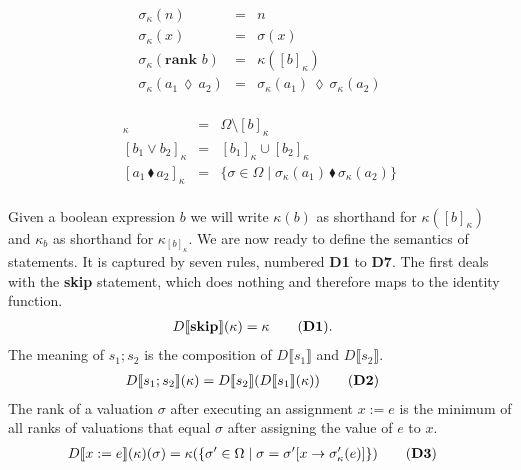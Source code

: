 \documentclass{llncs}
\newcommand{\mods}[2]{[#2]_{#1}}
\newcommand{\dn}[1]{D\llbracket #1 \rrbracket}
\newcommand{\areth}{\lozenge}
\newcommand{\comp}{\blacklozenge}
\newcommand{\States}{\Omega}
\begin{document}
\noindent\begin{minipage}{.40\columnwidth}
	\begin{eqnarray*}
	\sigma_\kappa(n)	 				&	=	&	n	\\
	\sigma_\kappa(x)	 				&	=	&	\sigma(x)	\\
	\sigma_\kappa(\textbf{rank }b) 			&	=	&	\kappa(\mods{\kappa}{b}) 	\\
	\sigma_\kappa(a_1 \hspace{2pt} \areth \hspace{2pt} a_2) 			&	=	&	\sigma_\kappa(a_1) \hspace{2pt} \areth \hspace{2pt} \sigma_\kappa(a_2) \\
	\end{eqnarray*}
\end{minipage}
\begin{minipage}{.60\columnwidth}
	\begin{eqnarray*}
	\mods{\kappa}{\neg b}				&	=	&	\States \setminus \mods{\kappa}{b}	\\
	\mods{\kappa}{b_1 \vee b_2} 			&	=	&	\mods{\kappa}{b_1} \cup \mods{\kappa}{b_2}	\\
	\mods{\kappa}{a_1 \hspace{2pt} \comp \hspace{2pt} a_2}			&	=	&	\{ \sigma \in \States \mid \sigma_\kappa(a_1) \hspace{2pt} \comp \hspace{2pt} \sigma_\kappa(a_2) \} \\
	\end{eqnarray*}
\end{minipage}

Given a boolean expression $b$ we will write $\kappa(b)$ as shorthand for $\kappa(\mods{\kappa}{b})$ and $\kappa_{b}$ as shorthand for $\kappa_{\mods{\kappa}{b}}$.
We are now ready to define the semantics of statements. 
It is captured by seven rules, numbered \textbf{D1} to \textbf{D7}.
The first deals with the \textbf{skip} statement, which does nothing and therefore maps to the identity function.
\begin{align}
\dn{\textbf{skip}}(\kappa) 		& = \kappa \tag{\textbf{D1}}. 
\end{align}
The meaning of $s_1; s_2$ is the composition of $\dn{s_1}$ and $\dn{s_2}$.
\begin{align}
\dn{s_1 ; s_2}(\kappa) 		& = \dn{s_2}(\dn{s_1}(\kappa))\tag{\textbf{D2}} 
\end{align}
The rank of a valuation $\sigma$ after executing an assignment $x := e$ 
	is the minimum of all ranks of valuations that equal $\sigma$ after assigning the value of $e$ to $x$.
\begin{align}
\dn{x := e}(\kappa)(\sigma) 	& = \kappa( \{ \sigma' \in \States \mid \sigma = \sigma'[x \rightarrow \sigma'_\kappa(e)] \})\tag{\textbf{D3}} 
\end{align}
\end{document}
